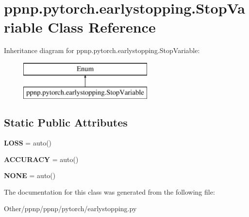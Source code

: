 \hypertarget{classppnp_1_1pytorch_1_1earlystopping_1_1StopVariable}{}\section{ppnp.\+pytorch.\+earlystopping.\+Stop\+Variable Class Reference}
\label{classppnp_1_1pytorch_1_1earlystopping_1_1StopVariable}
Inheritance diagram for ppnp.\+pytorch.\+earlystopping.\+Stop\+Variable\+:\begin{figure}[H]
\begin{center}
\leavevmode
\includegraphics[height=2.000000cm]{classppnp_1_1pytorch_1_1earlystopping_1_1StopVariable}
\end{center}
\end{figure}
\subsection*{Static Public Attributes}
\begin{DoxyCompactItemize}
\item 
\mbox{\label{classppnp_1_1pytorch_1_1earlystopping_1_1StopVariable_abc4180508deb3845e09f57d2d59ecc3c}} 
{\bfseries L\+O\+SS} = auto()
\item 
\mbox{\label{classppnp_1_1pytorch_1_1earlystopping_1_1StopVariable_ae777a572f51ef45c7c41370edf3074ba}} 
{\bfseries A\+C\+C\+U\+R\+A\+CY} = auto()
\item 
\mbox{\label{classppnp_1_1pytorch_1_1earlystopping_1_1StopVariable_a019d73b958b2389ace82a0c2ab54b13d}} 
{\bfseries N\+O\+NE} = auto()
\end{DoxyCompactItemize}


The documentation for this class was generated from the following file\+:\begin{DoxyCompactItemize}
\item 
Other/ppnp/ppnp/pytorch/earlystopping.\+py\end{DoxyCompactItemize}
